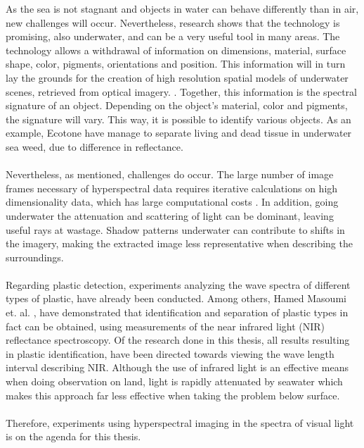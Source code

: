  As the sea is not stagnant and objects in water can behave differently than in air, new challenges will occur. Nevertheless, research shows that the technology is promising, also underwater, and can be a very useful tool in many areas. The technology allows a withdrawal of information on dimensions, material, surface shape, color, pigments, orientations and position. This information will in turn lay the grounds for the creation of high resolution spatial models of underwater scenes, retrieved from optical imagery. . Together, this information is the spectral signature of an object. Depending on the object's material, color and pigments, the signature will vary. This way, it is possible to identify various objects. As an example, Ecotone have manage to separate living and dead tissue in underwater sea weed, due to difference in reflectance. 
\\\\
Nevertheless, as mentioned, challenges do occur. The large number of image frames necessary of hyperspectral data requires iterative calculations on high dimensionality data, which has large computational costs . In addition, going underwater the attenuation and scattering of light can be dominant, leaving useful rays at wastage. Shadow patterns underwater can contribute to shifts in the imagery, making the extracted image less representative when describing the surroundings. 
\\\\


\noindent
 Regarding plastic detection, experiments analyzing the wave spectra of different types of plastic, have already been conducted. Among others, Hamed Masoumi et. al. , have demonstrated that identification and separation of plastic types in fact can be obtained, using measurements of the near infrared light (NIR) reflectance spectroscopy. Of the research done in this thesis, all results resulting in plastic identification, have been directed towards viewing the wave length interval describing NIR. Although the use of infrared light is an effective means when doing observation on land, light is rapidly attenuated by seawater which makes this approach far less effective when taking the problem below surface.
\\\\
Therefore, experiments using hyperspectral imaging in the spectra of visual light is on the agenda for this thesis. 

